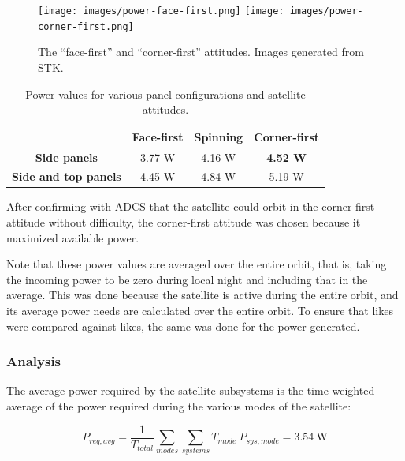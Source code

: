\documentclass[12pt]{article}
\begin{document}
			\begin{figure}[ht]%
\centering
\texttt{[image: images/power-face-first.png]}%
\hspace{0.5in}
\texttt{[image: images/power-corner-first.png]}
\caption{The ``face-first'' and ``corner-first'' attitudes.  Images generated from STK.}%
\label{fig:power-orientations}%
\end{figure}
			
			\begin{table}[ht]
\caption{Power values for various panel configurations and satellite attitudes.}
\label{tab:power-trade-study}
\begin{center}
    \begin{tabular}{|c|c|c|c|} \hline
    	 & \textbf{Face-first} & \textbf{Spinning} & \textbf{Corner-first} \\  \hline
\textbf{Side panels} & 3.77 W & 4.16 W & \textbf{4.52 W} \\\hline
\textbf{Side and top panels} & 4.45 W & 4.84 W & 5.19 W \\\hline
    \end{tabular}
\end{center}
\end{table}

After confirming with ADCS that the satellite could orbit in the corner-first attitude without difficulty, the corner-first attitude was chosen because it maximized available power.

Note that these power values are averaged over the entire orbit, that is, taking the incoming power to be zero during local night and including that in the average.  This was done because the satellite is active during the entire orbit, and its average power needs are calculated over the entire orbit.  To ensure that likes were compared against likes, the same was done for the power generated.
			
			\subsubsection{Analysis}
			
The average power required by the satellite subsystems is the time-weighted average of the power required during the various modes of the satellite:

\begin{equation}
P_{req,avg} = \frac{1}{T_{total}}\sum_{modes}{ \sum_{systems}{T_{mode} \: P_{sys,mode}} } = 3.54 \ \text{W} 
\label{eq:power-required}
\end{equation}
\end{document}
